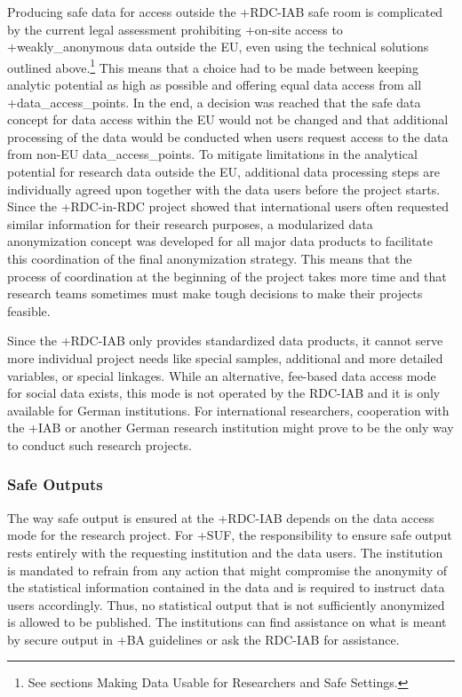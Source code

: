 \documentclass[
]{WileySix}
\begin{document}
Producing safe data for access outside the +RDC-IAB\textbar{} safe room is complicated by the current legal assessment prohibiting +on-site\textbar{} access to +weakly\_anonymous\textbar{} data outside the EU, even using the technical solutions outlined above.\footnote{See sections Making Data Usable for Researchers and Safe Settings.} This means that a choice had to be made between keeping analytic potential as high as possible and offering equal data access from all +data\_access\_points\textbar. In the end, a decision was reached that the safe data concept for data access within the EU would not be changed and that additional processing of the data would be conducted when users request access to the data from non-EU data\_access\_points. To mitigate limitations in the analytical potential for research data outside the EU, additional data processing steps are individually agreed upon together with the data users before the project starts. Since the +RDC-in-RDC\textbar{} project showed that international users often requested similar information for their research purposes, a modularized data anonymization concept was developed for all major data products to facilitate this coordination of the final anonymization strategy. This means that the process of coordination at the beginning of the project takes more time and that research teams sometimes must make tough decisions to make their projects feasible.

Since the +RDC-IAB\textbar{} only provides standardized data products, it cannot serve more individual project needs like special samples, additional and more detailed variables, or special linkages. While an alternative, fee-based data access mode for social data exists, this mode is not operated by the RDC-IAB and it is only available for German institutions. For international researchers, cooperation with the +IAB\textbar{} or another German research institution might prove to be the only way to conduct such research projects.

\hypertarget{safe-outputs}{%
\subsubsection{Safe Outputs}\label{safe-outputs}}

The way safe output is ensured at the +RDC-IAB\textbar{} depends on the data access mode for the research project. For +SUF\textbar, the responsibility to ensure safe output rests entirely with the requesting institution and the data users. The institution is mandated to refrain from any action that might compromise the anonymity of the statistical information contained in the data and is required to instruct data users accordingly. Thus, no statistical output that is not sufficiently anonymized is allowed to be published. The institutions can find assistance on what is meant by secure output in +BA\textbar{} guidelines \citep{statistikderbundesagenturfurarbeit2018} or ask the RDC-IAB for assistance.
\end{document}
